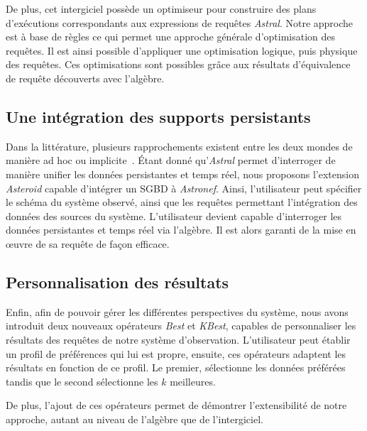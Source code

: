 De plus, cet intergiciel possède un optimiseur pour construire des plans d'exécutions correspondants aux expressions de requêtes \textit{Astral}. Notre approche est à base de règles ce qui permet une approche générale d'optimisation des requêtes. Il est ainsi possible d'appliquer une optimisation logique, puis physique des requêtes. Ces optimisations sont possibles grâce aux résultats d'équivalence de requête découverts avec l'algèbre.

\subsection{Une intégration des supports persistants}
Dans la littérature, plusieurs rapprochements existent entre les deux mondes de manière ad hoc ou implicite~\cite{Balazinska:moirae,Reiss:fastbit}. Étant donné qu'\textit{Astral} permet d'interroger de manière unifier les données persistantes et temps réel, nous proposons l'extension \textit{Asteroid} capable d'intégrer un SGBD à \textit{Astronef}. Ainsi, l'utilisateur peut spécifier le schéma du système observé, ainsi que les requêtes permettant l'intégration des données des sources du système. L'utilisateur devient capable d'interroger les données persistantes et temps réel via l'algèbre. Il est alors garanti de la mise en œuvre de sa requête de façon efficace.

\subsection{Personnalisation des résultats}
Enfin, afin de pouvoir gérer les différentes perspectives du système, nous avons introduit deux nouveaux opérateurs \textit{Best} et \textit{KBest}, capables de personnaliser les résultats des requêtes de notre système d'observation. L'utilisateur peut établir un profil de préférences qui lui est propre, ensuite, ces opérateurs adaptent les résultats en fonction de ce profil. Le premier, sélectionne les données préférées tandis que le second sélectionne les $k$ meilleures.

De plus, l'ajout de ces opérateurs permet de démontrer l'extensibilité de notre approche, autant au niveau de l'algèbre que de l'intergiciel.
